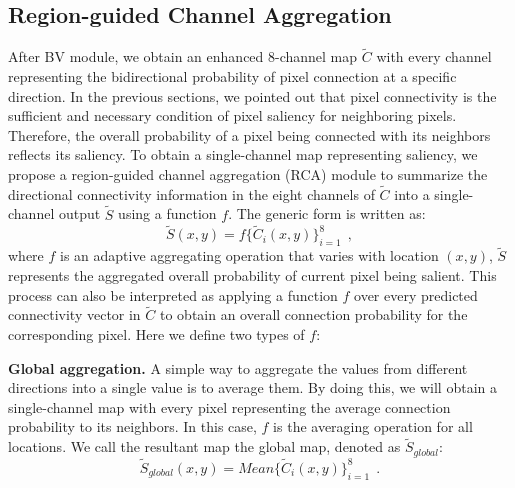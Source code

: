 \documentclass[review]{cvpr}
\begin{document}
\subsection{Region-guided Channel Aggregation}
\label{section3.4}
After BV module, we obtain an enhanced 8-channel map $\widetilde {C}$ with every channel representing the bidirectional probability of pixel connection at a specific direction. In the previous sections, we pointed out that pixel connectivity is the sufficient and necessary condition of pixel saliency for neighboring pixels. Therefore, the overall probability of a pixel being connected with its neighbors reflects its saliency. To obtain a single-channel map representing saliency, we propose a region-guided channel aggregation (RCA) module to summarize the directional connectivity information in the eight channels of $\widetilde {C}$ into a single-channel output $\widetilde {S}$ using a function $f$. The generic form is written as:
\begin{equation}
\widetilde S(x,y) = f\{ {\widetilde C_i}(x,y)\} _{i = 1}^8\ \ ,
\end{equation}
where $f$ is an adaptive aggregating operation that varies with location $(x,y)$, $\widetilde {S}$ represents the aggregated overall probability of current pixel being salient. This process can also be interpreted as applying a function $f$ over every predicted connectivity vector in $\widetilde {C}$ to obtain an overall connection probability for the corresponding pixel. Here we define two types of $f$:

\textbf{Global aggregation.} A simple way to aggregate the values from different directions into a single value is to average them. By doing this, we will obtain a single-channel map with every pixel representing the average connection probability to its neighbors. In this case, $f$ is the averaging operation for all locations. We call the resultant map the global map, denoted as $\widetilde S_{global}$:
\begin{equation}
{\widetilde S_{global}}(x,y) = Mean\{ {\widetilde C_i}(x,y)\} _{i = 1}^8\ \ .
\end{equation}
\end{document}
